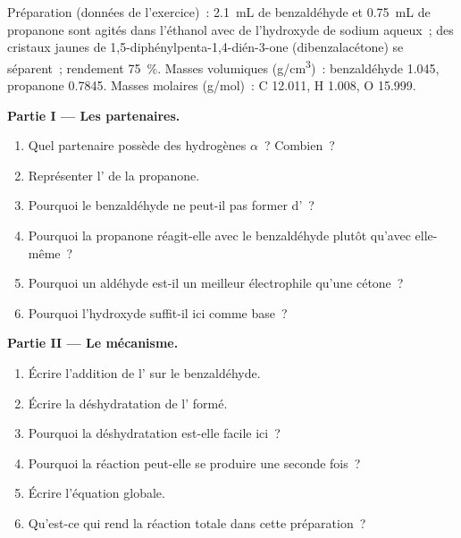 \begin{problem}
\label{pb:b2:enolates-aldol:1}
Préparation (données de l'exercice)~: \qty{2.1}{mL} de benzaldéhyde et \qty{0.75}{mL} de propanone sont
agités dans l'éthanol avec de l'hydroxyde de sodium aqueux~; des cristaux jaunes de
1,5-diphénylpenta-1,4-dién-3-one (dibenzalacétone) se séparent~; rendement 75~\%. Masses volumiques
(\unit{g/cm^3})~: benzaldéhyde 1.045, propanone 0.7845. Masses molaires (\unit{g/mol})~: C 12.011,
H 1.008, O 15.999.

\medskip
\noindent\textbf{Partie I --- Les partenaires.}
\begin{enumerate}
  \item Quel partenaire possède des hydrogènes $\alpha$~? Combien~?
  \item Représenter l' de la propanone.
  \item Pourquoi le benzaldéhyde ne peut-il pas former d'~?
  \item Pourquoi la propanone réagit-elle avec le benzaldéhyde plutôt qu'avec elle-même~?
  \item Pourquoi un aldéhyde est-il un meilleur électrophile qu'une cétone~?
  \item Pourquoi l'hydroxyde suffit-il ici comme base~?
\end{enumerate}

\medskip
\noindent\textbf{Partie II --- Le mécanisme.}
\begin{enumerate}[resume]
  \item Écrire l'addition de l' sur le benzaldéhyde.
  \item Écrire la déshydratation de l' formé.
  \item Pourquoi la déshydratation est-elle facile ici~?
  \item Pourquoi la réaction peut-elle se produire une seconde fois~?
  \item Écrire l'équation globale.
  \item Qu'est-ce qui rend la réaction totale dans cette préparation~?
\end{enumerate}


\end{problem}
